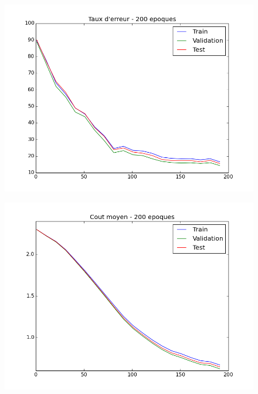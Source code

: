 \documentclass[a4paper,11pt]{article}
\begin{document}
\begin{figure}[H]
	\includegraphics[width=15cm]{images/best_taux_erreur.png}
	\centering
	\label{fig:comp}
\end{figure}

\begin{figure}[H]
	\includegraphics[width=15cm]{images/best_cout_moyen.png}
	\centering
	\label{fig:comp}
\end{figure}
\end{document}
